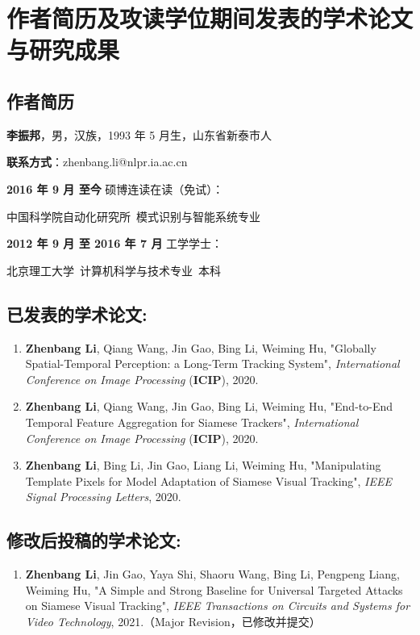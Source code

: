 \chapter{作者简历及攻读学位期间发表的学术论文与研究成果}

\section*{作者简历}

\textbf{李振邦}，男，汉族，1993 年 5 月生，山东省新泰市人

\textbf{联系方式}：zhenbang.li@nlpr.ia.ac.cn

\textbf{2016 年 9 月 至今} 硕博连读在读（免试）：

	中国科学院自动化研究所~模式识别与智能系统专业

\textbf{2012 年 9 月 至 2016 年 7 月} 工学学士：

	北京理工大学~计算机科学与技术专业~本科


\section*{已发表的学术论文:}

{
\setlist[enumerate]{}%
\begin{enumerate}[nosep]
    \item \textbf{Zhenbang Li}, Qiang Wang, Jin Gao,  Bing Li, Weiming Hu, "Globally Spatial-Temporal Perception: a Long-Term Tracking System", \textit{International Conference on Image Processing} (\textbf{ICIP}), 2020.
    \item \textbf{Zhenbang Li}, Qiang Wang, Jin Gao,  Bing Li, Weiming Hu, "End-to-End Temporal Feature Aggregation for Siamese Trackers", \textit{International Conference on Image Processing} (\textbf{ICIP}), 2020.
    \item \textbf{Zhenbang Li}, Bing Li, Jin Gao, Liang Li, Weiming Hu, "Manipulating Template Pixels for Model Adaptation of Siamese Visual Tracking", \textit{IEEE Signal Processing Letters}, 2020.
\end{enumerate}
}

\section*{修改后投稿的学术论文:}
{
\setlist[enumerate]{}%
\begin{enumerate}[nosep]
    \item \textbf{Zhenbang Li}, Jin Gao, Yaya Shi, Shaoru Wang, Bing Li, Pengpeng Liang, Weiming Hu, "A Simple and Strong Baseline for Universal Targeted Attacks on Siamese Visual Tracking", \textit{IEEE Transactions on Circuits and Systems for Video Technology}, 2021.（Major Revision，已修改并提交）
\end{enumerate}
}

